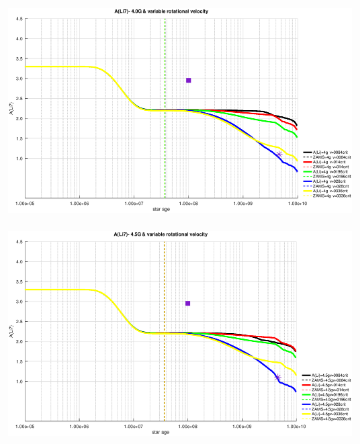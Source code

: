 \documentclass[fleqn,usenatbib]{mnras}
\begin{document}
\begin{figure}
    \begin{subfigure}[h]{0.47\textwidth}
    \includegraphics[width=\textwidth]{figures/li_var_vel_4_0g.eps}
    \label{fig:subim3}
    \end{subfigure}
    \begin{subfigure}[h]{0.47\textwidth}
    \includegraphics[width=\textwidth]{figures/li_var_vel_4_5g.eps}
    \label{fig:subim4}
    \end{subfigure}
    

\end{figure}
\end{document}

